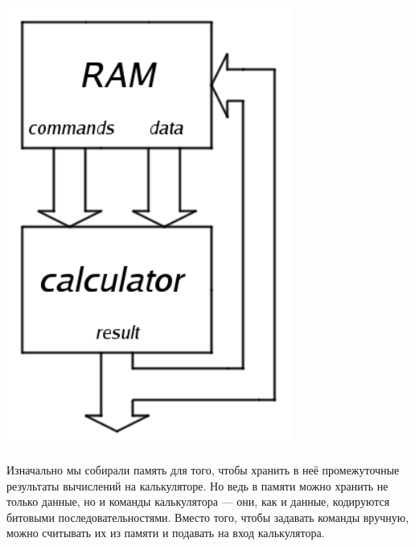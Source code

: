 \documentclass[11pt]{book}
\begin{document}
\\
\begin{minipage}{0.3\textwidth}
\centering
\includegraphics[width=0.7\textwidth]{pic/calculator_ram.png}
\end{minipage}
\begin{minipage}{0.7\textwidth}
Изначально мы собирали память для того, чтобы хранить в неё промежуточные результаты вычислений на калькуляторе.
Но ведь в памяти можно хранить не только данные, но и команды калькулятора ---
они, как и данные, кодируются битовыми последовательностями.
Вместо того, чтобы задавать команды вручную, можно считывать их из памяти и подавать на вход калькулятора.
\end{minipage}
\end{document}
